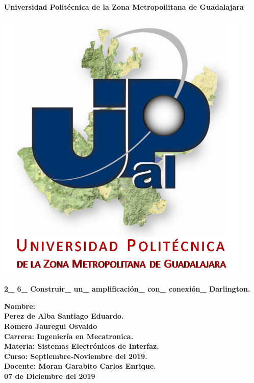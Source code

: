 \documentclass[14pt,letterpaper]{article}
\author{Perez de Alba Santiago Eduardo.}
\begin{document}
\begin{center}

\LARGE \textbf{Universidad Politécnica de la Zona Metropoilitana de Guadalajara\\}

\includegraphics[scale=1]{Upzmg.png} 

\large \textbf{2\_ 6\_ Construir\_ un\_ amplificación\_ con\_ conexión\_ Darlington.}

\end{center}

\vspace{1cm} 
\large \textbf{Nombre: \\Perez de Alba Santiago Eduardo.\\ Romero Jauregui Osvaldo\\
\vspace{0.5cm} Carrera: Ingeniería en Mecatronica.\\
\vspace{0.5cm} Materia: Sistemas Electrónicos de Interfaz.\\
\vspace{0.5cm} Curso: Septiembre-Noviembre del 2019.\\
\vspace{0.5cm} Docente: Moran Garabito Carlos Enrique.}\\
\vspace{0.5cm}
\small \textbf{07 de Diciembre del 2019}
\end{document}
